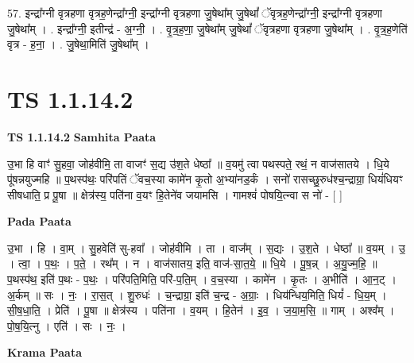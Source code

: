 \documentclass[17pt]{extarticle}
\begin{document}
57. इन्द्रा᳚ग्नी वृत्रहणा वृत्रह॒णेन्द्रा᳚ग्नी॒ इन्द्रा᳚ग्नी वृत्रहणा जु॒षेथा᳚म् जु॒षेथां᳚ ॅवृत्रह॒णेन्द्रा᳚ग्नी॒ इन्द्रा᳚ग्नी वृत्रहणा जु॒षेथा᳚म् । . इन्द्रा᳚ग्नी॒ इतीन्द्र॑ - अ॒ग्नी॒ । . वृ॒त्र॒ह॒णा॒ जु॒षेथा᳚म् जु॒षेथां᳚ ॅवृत्रहणा वृत्रहणा जु॒षेथा᳚म् । . वृ॒त्र॒ह॒णेति॑ वृत्र - ह॒ना॒ । . जु॒षेथा॒मिति॑ जु॒षेथा᳚म् । \newline
\pagebreak
{}

\section{ TS 1.1.14.2 }

\textbf{TS 1.1.14.2 } \newline
\textbf{Samhita Paata} \newline

उ॒भा हि वाꣳ॑ सु॒हवा॒ जोह॑वीमि॒ ता वाजꣳ॑ स॒द्य उ॑श॒ते धेष्ठा᳚ ॥ व॒यमु॑ त्वा पथस्पते॒ रथं॒ न वाज॑सातये । धि॒ये पू॑षन्नयुज्महि ॥ प॒थस्प॑थः॒ परि॑पतिं ॅवच॒स्या कामे॑न कृ॒तो अ॒भ्या॑नड॒र्कं । सनो॑ रासच्छु॒रुध॑श्च॒न्द्राग्रा॒ धियं॑धियꣳ सीषधाति॒ प्र पू॒षा ॥ क्षेत्र॑स्य॒ पति॑ना व॒यꣳ हि॒तेने॑व जयामसि । गामश्वं॑ पोषयि॒त्न्वा स नो॑ - [ ] \newline

\textbf{Pada Paata} \newline

उ॒भा । हि । वा॒म् । सु॒हवेति॑ सु-हवा᳚ । जोह॑वीमि । ता । वाज᳚म् । स॒द्यः । उ॒श॒ते । धेष्ठा᳚ ॥ व॒यम् । उ॒ । त्वा॒ । प॒थः॒ । प॒ते॒ । रथ᳚म् । न । वाज॑सातय॒ इति॒ वाज॑-सा॒त॒ये॒ ॥ धि॒ये । पू॒ष॒न्न् । अ॒यु॒ज्म॒हि॒ ॥ प॒थस्प॑थ॒ इति॑ प॒थः - प॒थः॒ । परि॑पति॒मिति॒ परि॑-प॒ति॒म् । व॒च॒स्या । कामे॑न । कृ॒तः । अ॒भीति॑ । आ॒न॒ट् । अ॒र्कम् ॥ सः । नः॒ । रा॒स॒त् । शु॒रुधः॑ । च॒न्द्राग्रा॒ इति॑ च॒न्द्र - अ॒ग्राः॒ । धिय॑न्धिय॒मिति॒ धियं᳚ - धि॒य॒म् । सी॒ष॒धा॒ति॒ । प्रेति॑ । पू॒षा ॥ क्षेत्र॑स्य । पति॑ना । व॒यम् । हि॒तेन॑ । इ॒व॒ । ज॒या॒म॒सि॒ ॥ गाम् । अश्व᳚म् । पो॒ष॒यि॒त्नु । एति॑ । सः । नः॒ ।  \newline


\textbf{Krama Paata} \newline
\end{document}
